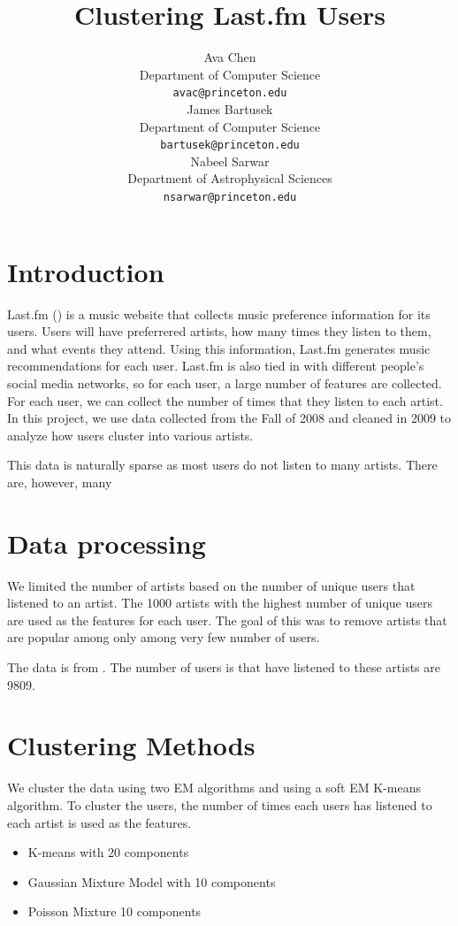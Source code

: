 \documentclass{article} %
\title{Clustering Last.fm Users}
\author{
Ava Chen\\
Department of Computer Science\\
\texttt{avac@princeton.edu}\\
\And
James Bartusek\\
Department of Computer Science\\
\texttt{bartusek@princeton.edu} \\
\And
Nabeel Sarwar\\
Department of Astrophysical Sciences\\
\texttt{nsarwar@princeton.edu} \\
}
\begin{document}
\maketitle

\begin{abstract}
\end{abstract}


\section{Introduction}

Last.fm (\cite{lastfm}) is a music website that collects music preference information for its users. Users will have preferrered artists, how many times they listen to them, and what events they attend. Using this information, Last.fm generates music recommendations for each user. Last.fm is also tied in with different people's social media networks, so for each user, a large number of features are collected. For each user, we can collect the number of times that they listen to each artist. In this project, we use data collected from the Fall of 2008 and cleaned in 2009 to analyze how users cluster into various artists.  

This data is naturally sparse as most users do not listen to many artists. There are, however, many 

\section{Data processing}

We limited the number of artists based on the number of unique users that listened to an artist. The 1000 artists with the highest number of unique users are used as the features for each user. The goal of this was to remove artists that are popular among only among very few number of users. 

The data is from \cite{data}. The number of users is that have listened to these artists are 9809. 


\section{Clustering Methods}


We cluster the data using two EM algorithms and using a soft EM K-means algorithm. To cluster the users, the number of times each users has listened to each artist is used as the features. 


\begin{itemize}
    \item K-means with 20 components
    \item Gaussian Mixture Model with 10 components
    \item Poisson Mixture 10 components
\end{itemize}
\end{document}
